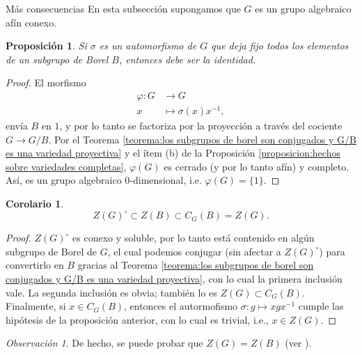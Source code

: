\documentclass[spanish,12pt]{amsart}
\makeatletter
\renewcommand\subsection{\@startsection{subsection}{2}%
  \z@{.5\linespacing\@plus.7\linespacing}{-.5em}%
  {\normalfont\sffamily}}
\newtheorem{corollary}[theorem]{Corolario}
\newtheorem{proposition}[theorem]{Proposición}
\theoremstyle{definition}
\theoremstyle{remark}
\newtheorem{remark}[theorem]{Observación}
\numberwithin{equation}{section}
\makeatother
\begin{document}
\subsection{Más consecuencias}
En esta subsección supongamos que $G$ es un grupo algebraico afín conexo.


\begin{proposition}
Si $\sigma$ es un automorfismo de $G$ que deja fijo todos los elementos de un subgrupo de Borel $B$, entonces debe ser la identidad.
\end{proposition}
\begin{proof}
El morfismo
\begin{align*}
\varphi : G &\longrightarrow G \\
x &\longmapsto \sigma(x)x^{-1},
\end{align*}
envía $B$ en $1$, y por lo tanto se factoriza por la proyección a través del cociente $G \to G/B$. Por el Teorema \ref{teorema:los subgrupos de borel son conjugados y G/B es una variedad proyectiva} y el ítem (b) de la Proposición \ref{proposicion:hechos sobre variedades completas}, $\varphi (G)$ es cerrado (y por lo tanto afín) y completo. Así, es un grupo algebraico $0$-dimensional, i.e. $\varphi (G) = \{1\}$.
\end{proof}

\begin{corollary}
\[
    Z(G)^{\circ} \subset Z(B) \subset C_G (B) = Z(G).
\]
\end{corollary}
\begin{proof}
$Z(G)^\circ$ es conexo y soluble, por lo tanto está contenido en algún subgrupo de Borel de $G$, el cual podemos conjugar (sin afectar a $Z(G)^\circ$) para convertirlo en $B$ gracias al Teorema \ref{teorema:los subgrupos de borel son conjugados y G/B es una variedad proyectiva}, con lo cual la primera inclusión vale. La segunda inclusión es obvia; también lo es $Z(G) \subset C_G (B)$. Finalmente, si $x \in C_G (B)$, entonces el autormofismo $\sigma : g \mapsto x g x^{-1}$ cumple las hipótesis de la proposición anterior, con lo cual es trivial, i.e., $x \in Z(G)$.
\end{proof}

\begin{remark}
De hecho, se puede probar que $Z(G) = Z(B)$ (ver \cite[Corolario B \S 22.2]{humphreys2012linearAlgebraicGroups}).
\end{remark}
\end{document}
